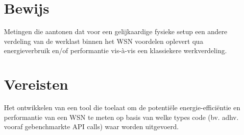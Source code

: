 \documentclass[11pt]{article}
\begin{document}
\section{Bewijs}
\label{sec-5}
Metingen die aantonen dat voor een gelijkaardige fysieke setup een
andere verdeling van de werklast binnen het WSN voordelen oplevert qua
energieverbruik en/of performantie vis-à-vis een klassiekere
werkverdeling.
\section{Vereisten}
\label{sec-6}
Het ontwikkelen van een tool die toelaat om de potentiële
energie-efficiëntie en performantie van een WSN te meten op basis van
welke types code (bv. adhv. vooraf gebenchmarkte API calls) waar
worden uitgevoerd.
\end{document}
